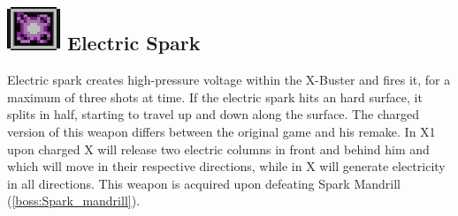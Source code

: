 \subsection{\includegraphics[scale=0.2]{figures/X1/Spark_mandrill/Elec_S.png} Electric Spark}\label{Electric_spark}
Electric spark creates high-pressure voltage within the X-Buster and fires it, for a maximum of three shots at time. If the electric spark hits an hard surface, it splits in half, starting to travel up and down along the surface. The charged version of this weapon differs between the original game and his remake. In X1 upon charged X will release two electric columns in front and behind him and which will move in their respective directions, while in \mhx X will generate electricity in all directions. This weapon is acquired upon defeating Spark Mandrill (\ref{boss:Spark_mandrill}).
